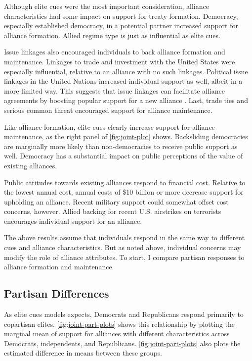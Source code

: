 \documentclass[12pt]{article}
\begin{document}
Although elite cues were the most important consideration, alliance characteristics had some impact on support for treaty formation. 
Democracy, especially established democracy, in a potential partner increased support for alliance formation. 
Allied regime type is just as influential as elite cues. 


Issue linkages also encouraged individuals to back alliance formation and maintenance. 
Linkages to trade and investment with the United States were especially influential, relative to an alliance with no such linkages. 
Political issue linkages in the United Nations increased individual support as well, albeit in a more limited way. 
This suggests that issue linkages can facilitate alliance agreements by boosting popular support for a new alliance \citep{Poast2012}. 
Last, trade ties and serious common threat encouraged support for alliance maintenance. 


Like alliance formation, elite cues clearly increase support for alliance maintenance, as the right panel of \autoref{fig:joint-plot} shows. 
Backsliding democracies are marginally more likely than non-democracies to receive public support as well. 
Democracy has a substantial impact on public perceptions of the value of existing alliances. 


Public attitudes towards existing alliances respond to financial cost.
Relative to the lowest annual cost, annual costs of \$10 billion or more decrease support for upholding an alliance.  
Recent military support could somewhat offset cost concerns, however. 
Allied backing for recent U.S. airstrikes on terrorists encourages individual support for an alliance. 


The above results assume that individuals respond in the same way to different cues and alliance characteristics. 
But as noted above, individual concerns may modify the role of alliance attributes.
To start, I compare partisan responses to alliance formation and maintenance. 



\subsection{Partisan Differences}


As elite cues models expects, Democrats and Republicans respond primarily to copartisan elites.
\autoref{fig:joint-part-plots} shows this relationship by plotting the marginal mean of support for alliances with different characteristics across Democrats, independents, and Republicans. 
\autoref{fig:joint-part-plots} also plots the estimated difference in means between these groups. 
\end{document}
